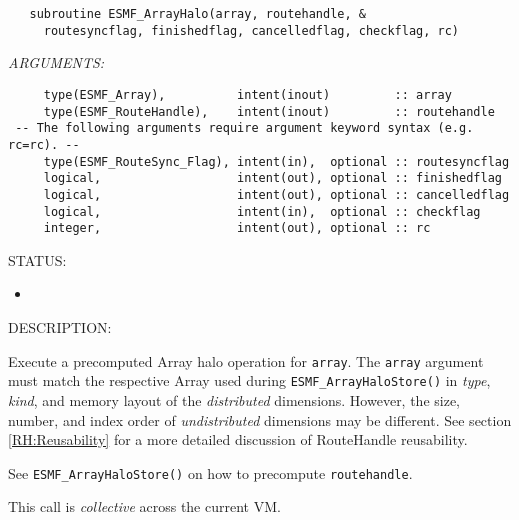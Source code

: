   
\begin{verbatim}   subroutine ESMF_ArrayHalo(array, routehandle, &
     routesyncflag, finishedflag, cancelledflag, checkflag, rc)\end{verbatim}{\em ARGUMENTS:}
\begin{verbatim}     type(ESMF_Array),          intent(inout)         :: array
     type(ESMF_RouteHandle),    intent(inout)         :: routehandle
 -- The following arguments require argument keyword syntax (e.g. rc=rc). --
     type(ESMF_RouteSync_Flag), intent(in),  optional :: routesyncflag
     logical,                   intent(out), optional :: finishedflag
     logical,                   intent(out), optional :: cancelledflag
     logical,                   intent(in),  optional :: checkflag
     integer,                   intent(out), optional :: rc\end{verbatim}
{\sf STATUS:}
   \begin{itemize}
   \item{}
   \end{itemize}
  
{\sf DESCRIPTION:\\ }


     Execute a precomputed Array halo operation for {\tt array}.
     The {\tt array} argument must match the respective Array
     used during {\tt ESMF\_ArrayHaloStore()} in {\em type}, {\em kind}, and 
     memory layout of the {\em distributed} dimensions. However, the size,
     number, and index order of {\em undistributed} dimensions may be different.
     See section \ref{RH:Reusability} for a more detailed discussion of
     RouteHandle reusability.
  
     See {\tt ESMF\_ArrayHaloStore()} on how to precompute {\tt routehandle}.
  
     This call is {\em collective} across the current VM.
  
